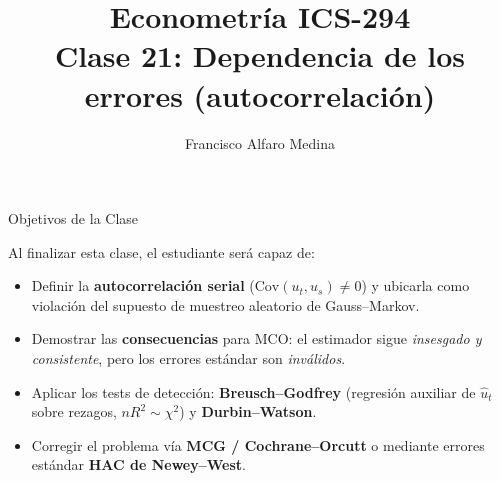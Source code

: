 \documentclass{beamer}
\title[ICS-294]{Econometría ICS-294\\ \small{Clase 21: Dependencia de los errores (autocorrelación)}}
\author{Francisco Alfaro Medina}
\institute[USM]
{Universidad Técnica Federico Santa María\\ %
	\medskip
	\textit{francisco.alfaro@usm.cl} %

}
\date{}
\begin{document}
	
\begin{frame}
	\titlepage %


\end{frame}
\logo{}

\begin{frame}{Objetivos de la Clase}

Al finalizar esta clase, el estudiante será capaz de:

\begin{itemize}
    \item[\checkmark] Definir la \textbf{autocorrelación serial} ($\text{Cov}(u_t,u_s)\neq0$) y ubicarla como violación del supuesto de muestreo aleatorio de Gauss--Markov.
    \item[\checkmark] Demostrar las \textbf{consecuencias} para MCO: el estimador sigue \emph{insesgado y consistente}, pero los errores estándar son \emph{inválidos}.
    \item[\checkmark] Aplicar los tests de detección: \textbf{Breusch--Godfrey} (regresión auxiliar de $\hat u_t$ sobre rezagos, $nR^2\sim\chi^2$) y \textbf{Durbin--Watson}.
    \item[\checkmark] Corregir el problema vía \textbf{MCG / Cochrane--Orcutt} o mediante errores estándar \textbf{HAC de Newey--West}.
\end{itemize}

\end{frame}
\end{document}
